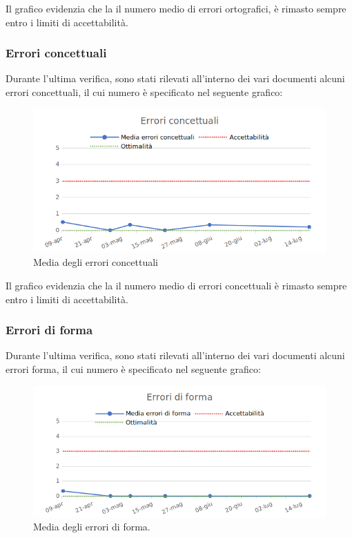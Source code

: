 Il grafico evidenzia che la il numero medio di errori ortografici, è rimasto sempre entro i limiti di accettabilità.

\subsubsection{Errori concettuali}

Durante l'ultima verifica, sono stati rilevati all'interno dei vari documenti alcuni errori concettuali, il cui numero è specificato nel seguente grafico:

\begin{figure}[h!]
	\centering
	\includegraphics[scale=0.75]{img/Grafici/Errori_conce.png}
	\caption{Media degli errori concettuali}
	\label{fig:Errori_conce}
\end{figure}

Il grafico evidenzia che la il numero medio di errori concettuali è rimasto sempre entro i limiti di accettabilità.

\newpage
\subsubsection{Errori di forma}

Durante l'ultima verifica, sono stati rilevati all'interno dei vari documenti alcuni errori forma, il cui numero è specificato nel seguente grafico:

\begin{figure}[h!]
	\centering
	\includegraphics[scale=0.75]{img/Grafici/Errori_forma.png}
	\caption{Media degli errori di forma.}
	\label{fig:Errori_forma}
\end{figure}

